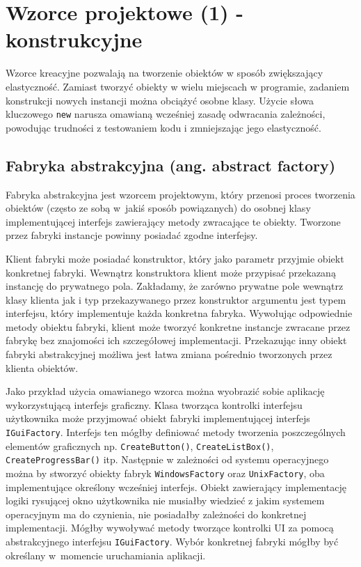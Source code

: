 \section{Wzorce projektowe (1) - konstrukcyjne}
Wzorce kreacyjne pozwalają na tworzenie obiektów w sposób zwiększający elastyczność. Zamiast tworzyć obiekty w wielu miejscach w programie, zadaniem konstrukcji nowych instancji można obciążyć osobne klasy. Użycie słowa kluczowego \texttt{new} narusza omawianą wcześniej zasadę odwracania zależności, powodując trudności z testowaniem kodu i zmniejszając jego elastyczność. 

\subsection{Fabryka abstrakcyjna (ang. abstract factory)}\label{sec/lab2/abstractFactory}
Fabryka abstrakcyjna jest wzorcem projektowym, który przenosi proces tworzenia obiektów (często ze sobą w~jakiś sposób powiązanych) do osobnej klasy implementującej interfejs zawierający metody zwracające te obiekty. Tworzone przez fabryki instancje powinny posiadać zgodne interfejsy.

Klient fabryki może posiadać konstruktor, który jako parametr przyjmie obiekt konkretnej fabryki. Wewnątrz konstruktora klient może przypisać przekazaną instancję do prywatnego pola. Zakładamy, że zarówno prywatne pole wewnątrz klasy klienta jak i typ przekazywanego przez konstruktor argumentu jest typem interfejsu, który implementuje każda konkretna fabryka. Wywołując odpowiednie metody obiektu fabryki, klient może tworzyć konkretne instancje zwracane przez fabrykę bez znajomości ich szczegółowej implementacji. Przekazując inny obiekt fabryki abstrakcyjnej możliwa jest łatwa zmiana pośrednio tworzonych przez klienta obiektów.

Jako przykład użycia omawianego wzorca można wyobrazić sobie aplikację wykorzystującą interfejs graficzny. Klasa tworząca kontrolki interfejsu użytkownika może przyjmować obiekt fabryki implementującej interfejs \texttt{IGuiFactory}. Interfejs ten mógłby definiować metody tworzenia poszczególnych elementów graficznych np. \texttt{CreateButton()}, \texttt{CreateListBox()}, \texttt{CreateProgressBar()} itp. Następnie w zależności od systemu operacyjnego można by stworzyć obiekty fabryk \texttt{WindowsFactory} oraz \texttt{UnixFactory}, oba implementujące określony wcześniej interfejs. Obiekt zawierający implementację logiki rysującej okno użytkownika nie musiałby wiedzieć z jakim systemem operacyjnym ma do czynienia, nie posiadałby zależności do konkretnej implementacji. Mógłby wywoływać metody tworzące kontrolki UI za pomocą abstrakcyjnego interfejsu \texttt{IGuiFactory}. Wybór konkretnej fabryki mógłby być określany w~momencie uruchamiania aplikacji.

